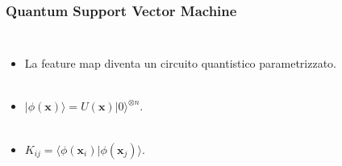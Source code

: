 \documentclass{beamer}
\begin{document}
\begin{frame}

  \frametitle{Quantum Support Vector Machine}
  
  \begin{columns}
  
    \begin{itemize}
      \item<1-> La feature map diventa un circuito quantistico parametrizzato. \\\,
          \item<2-> $|\phi(\mathbf{x})\rangle=U(\mathbf{x})|0\rangle^{\otimes n}$.\\\,
          \item<3->  $K_{ij}=\langle \phi(\mathbf{x}_i)| \phi(\mathbf{x}_j) \rangle.$
          \end{itemize}
    

\end{columns}
\end{frame}
\end{document}
